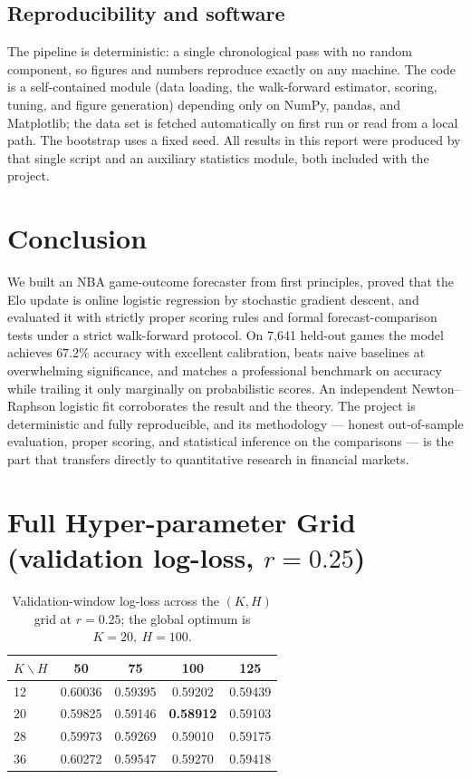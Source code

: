 \documentclass[11pt]{article}
\begin{document}
\subsection{Reproducibility and software}
The pipeline is deterministic: a single chronological pass with no random
component, so figures and numbers reproduce exactly on any machine. The code is a
self-contained module (data loading, the walk-forward estimator, scoring, tuning,
and figure generation) depending only on NumPy, pandas, and Matplotlib; the data
set is fetched automatically on first run or read from a local path. The bootstrap
uses a fixed seed. All results in this report were produced by that single script
and an auxiliary statistics module, both included with the project.

\section{Conclusion}
We built an NBA game-outcome forecaster from first principles, proved that the
Elo update is online logistic regression by stochastic gradient descent, and
evaluated it with strictly proper scoring rules and formal forecast-comparison
tests under a strict walk-forward protocol. On 7{,}641 held-out games the model
achieves $67.2\%$ accuracy with excellent calibration, beats naive baselines at
overwhelming significance, and matches a professional benchmark on accuracy while
trailing it only marginally on probabilistic scores. An independent
Newton--Raphson logistic fit corroborates the result and the theory. The project
is deterministic and fully reproducible, and its methodology --- honest
out-of-sample evaluation, proper scoring, and statistical inference on the
comparisons --- is the part that transfers directly to quantitative research in
financial markets.

\appendix
\section{Full Hyper-parameter Grid (validation log-loss, \texorpdfstring{$r=0.25$}{r=0.25})}
\begin{table}[h]
\centering
\begin{tabular}{lcccc}
\toprule
$K \backslash H$ & 50 & 75 & 100 & 125 \\
\midrule
12 & 0.60036 & 0.59395 & 0.59202 & 0.59439 \\
20 & 0.59825 & 0.59146 & \textbf{0.58912} & 0.59103 \\
28 & 0.59973 & 0.59269 & 0.59010 & 0.59175 \\
36 & 0.60272 & 0.59547 & 0.59270 & 0.59418 \\
\bottomrule
\end{tabular}
\caption{Validation-window log-loss across the $(K,H)$ grid at $r=0.25$; the
global optimum is $K=20,\ H=100$.}
\end{table}
\end{document}
